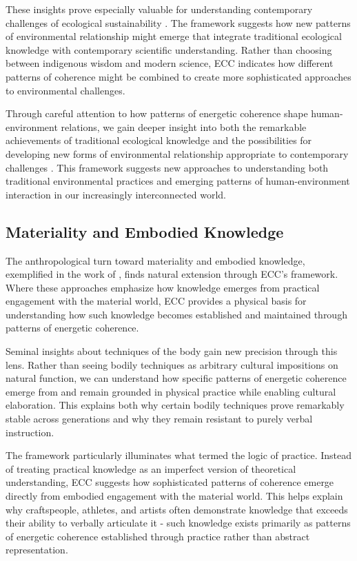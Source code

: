 These insights prove especially valuable for understanding contemporary challenges of ecological sustainability \cite{viveiros2014cannibal}. The framework suggests how new patterns of environmental relationship might emerge that integrate traditional ecological knowledge with contemporary scientific understanding. Rather than choosing between indigenous wisdom and modern science, ECC indicates how different patterns of coherence might be combined to create more sophisticated approaches to environmental challenges.

Through careful attention to how patterns of energetic coherence shape human-environment relations, we gain deeper insight into both the remarkable achievements of traditional ecological knowledge and the possibilities for developing new forms of environmental relationship appropriate to contemporary challenges \cite{strathern1980nature}. This framework suggests new approaches to understanding both traditional environmental practices and emerging patterns of human-environment interaction in our increasingly interconnected world.

\subsection{Materiality and Embodied Knowledge}

The anthropological turn toward materiality and embodied knowledge, exemplified in the work of \cite{ingold2013making,jackson1989knowledge,csordas1990embodiment}, finds natural extension through ECC's framework. Where these approaches emphasize how knowledge emerges from practical engagement with the material world, ECC provides a physical basis for understanding how such knowledge becomes established and maintained through patterns of energetic coherence.

Seminal insights about techniques of the body \cite{mauss1935techniques} gain new precision through this lens. Rather than seeing bodily techniques as arbitrary cultural impositions on natural function, we can understand how specific patterns of energetic coherence emerge from and remain grounded in physical practice while enabling cultural elaboration. This explains both why certain bodily techniques prove remarkably stable across generations and why they remain resistant to purely verbal instruction.

The framework particularly illuminates what \cite{bourdieu1990logic} termed the logic of practice. Instead of treating practical knowledge as an imperfect version of theoretical understanding, ECC suggests how sophisticated patterns of coherence emerge directly from embodied engagement with the material world. This helps explain why craftspeople, athletes, and artists often demonstrate knowledge that exceeds their ability to verbally articulate it - such knowledge exists primarily as patterns of energetic coherence established through practice rather than abstract representation.

